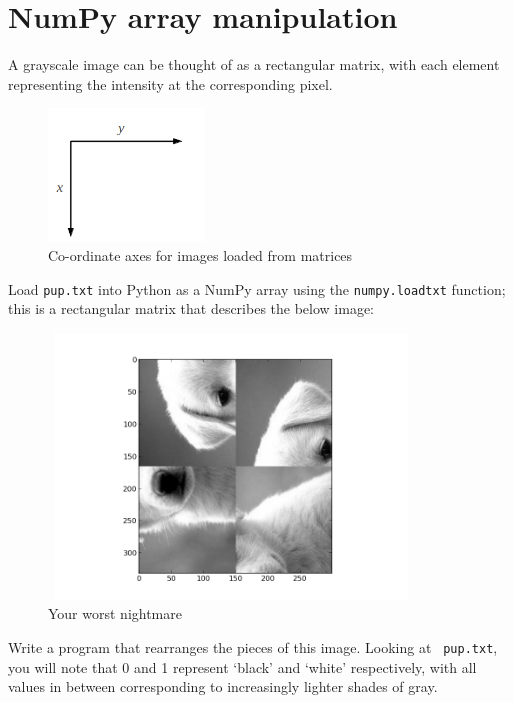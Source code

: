 \documentclass{article}
\begin{document}
\section*{NumPy array manipulation}
A grayscale image can be thought of as a rectangular matrix, with each element
representing the intensity at the corresponding pixel. \newline
\begin{figure}[h]
\begin{center}
\includegraphics[height=100pt]{../pictures/image_axes.png}
\caption{Co-ordinate axes for images loaded from matrices}
\end{center}
\end{figure}
\newline
Load \texttt{pup.txt} into Python as a NumPy array using the \texttt{numpy.loadtxt} 
function; this is a rectangular matrix that describes the below image:
\newline
\begin{figure}[h]
\begin{center}
\includegraphics[height=200pt, width=275pt]{../pictures/pup.png}
\caption{Your worst nightmare}
\end{center}
\end{figure}

Write a program that rearranges the pieces of this image. Looking at \texttt{
pup.txt}, you will note that 0 and 1 represent `black' and `white' respectively,
with all values in between corresponding to increasingly lighter shades of gray.
\end{document}
